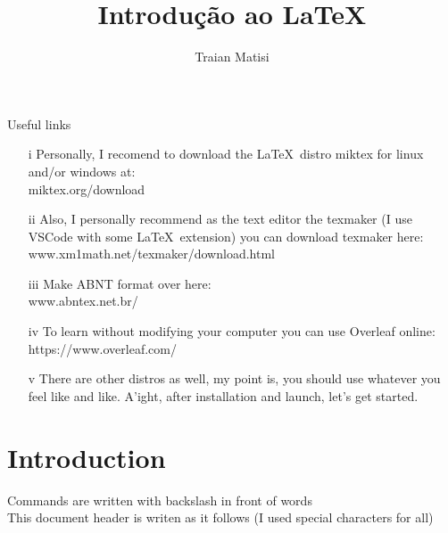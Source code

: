 \documentclass[12pt, a4paper]{article}
\begin{document}
\title{Introdução ao \LaTeX}
\author{Traian Matisi}
\maketitle

Useful links
\begin{itemize}
    \item[i]Personally, I recomend to download the \LaTeX\ distro miktex for linux and/or windows at:\\
    miktex.org/download
    \item[ii]Also, I personally recommend as the text editor the texmaker (I use VSCode with some \LaTeX\ extension) you can download texmaker here:\\
    www.xm1math.net/texmaker/download.html
    \item[iii]Make ABNT format over here:\\
    www.abntex.net.br/
    \item[iv]To learn without modifying your computer you can use Overleaf online:\\
    https://www.overleaf.com/
    \item[v]There are other distros as well, my point is, you should use whatever you feel like and like. A'ight, after installation and launch, let's get started.
\end{itemize}

\section{Introduction}
Commands are written with backslash in front of words\\
This document header is writen as it follows (I used special characters for all)
\end{document}
